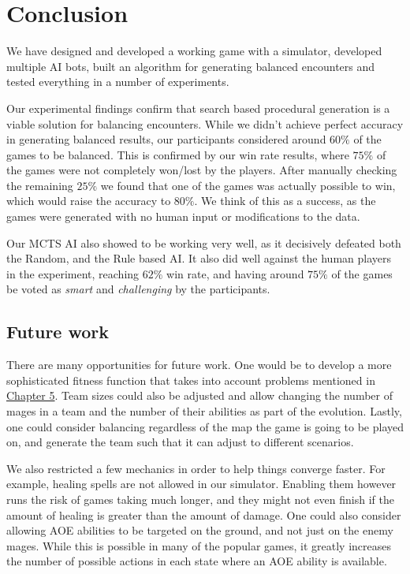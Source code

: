\chapter{Conclusion}
\label{chapter06}

We have designed and developed a working game with a simulator, developed multiple
AI bots, built an algorithm for generating balanced encounters and tested everything
in a number of experiments.

Our experimental findings confirm that search based procedural generation
is a viable solution for balancing encounters. While we didn't achieve perfect
accuracy in generating balanced results, our participants considered around $60\%$
of the games to be balanced. This is confirmed by our win rate results, where $75\%$
of the games were not completely won/lost by the players. After manually checking the remaining
$25\%$ we found that one of the games was actually possible to win, which would raise the accuracy
to $80\%$. We think of this as a success, as the games were generated with no human input or modifications to the data.

Our MCTS AI also showed to be working very well, as it decisively defeated both the Random, and the Rule based AI.
It also did well against the human players in the experiment, reaching $62\%$ win rate, and having around $75\%$ of the
games be voted as \emph{smart} and \emph{challenging} by the participants.

\section{Future work}

There are many opportunities for future work. One would be to develop a more sophisticated fitness function that
takes into account problems mentioned in \hyperref[chapter05]{Chapter 5}. Team sizes could also be adjusted and allow
changing the number of mages in a team and the number of their abilities as part of the evolution. Lastly, one could
consider balancing regardless of the map the game is going to be played on, and generate the team such that it can adjust
to different scenarios.

We also restricted a few mechanics in order to help things converge faster. For example, healing spells are not allowed
in our simulator. Enabling them however runs the risk of games taking much longer, and they might not even finish if
the amount of healing is greater than the amount of damage. One could also consider allowing AOE abilities to be targeted
on the ground, and not just on the enemy mages. While this is possible in many of the popular games, it greatly increases
the number of possible actions in each state where an AOE ability is available.